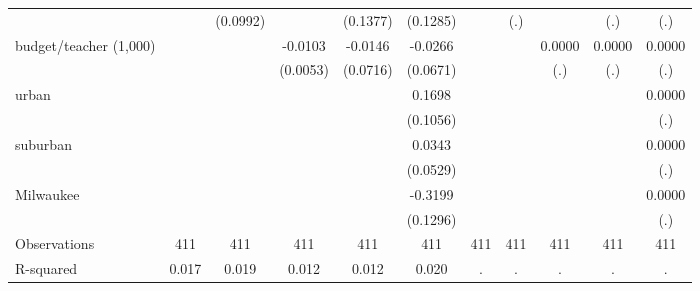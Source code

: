{\begin{tabular}{l*{10}{c}}
                    &                     &    (0.0992)         &                     &    (0.1377)         &    (0.1285)         &                     &         (.)         &                     &         (.)         &         (.)         \\
[1em]
budget/teacher (1,000)&                     &                     &     -0.0103\sym{*}  &     -0.0146         &     -0.0266         &                     &                     &      0.0000         &      0.0000         &      0.0000         \\
                    &                     &                     &    (0.0053)         &    (0.0716)         &    (0.0671)         &                     &                     &         (.)         &         (.)         &         (.)         \\
[1em]
urban               &                     &                     &                     &                     &      0.1698         &                     &                     &                     &                     &      0.0000         \\
                    &                     &                     &                     &                     &    (0.1056)         &                     &                     &                     &                     &         (.)         \\
[1em]
suburban            &                     &                     &                     &                     &      0.0343         &                     &                     &                     &                     &      0.0000         \\
                    &                     &                     &                     &                     &    (0.0529)         &                     &                     &                     &                     &         (.)         \\
[1em]
Milwaukee           &                     &                     &                     &                     &     -0.3199\sym{**} &                     &                     &                     &                     &      0.0000         \\
                    &                     &                     &                     &                     &    (0.1296)         &                     &                     &                     &                     &         (.)         \\
\hline
Observations        &         411         &         411         &         411         &         411         &         411         &         411         &         411         &         411         &         411         &         411         \\
R-squared           &       0.017         &       0.019         &       0.012         &       0.012         &       0.020         &           .         &           .         &           .         &           .         &           .         \\
\hline\hline
\end{tabular}
}
